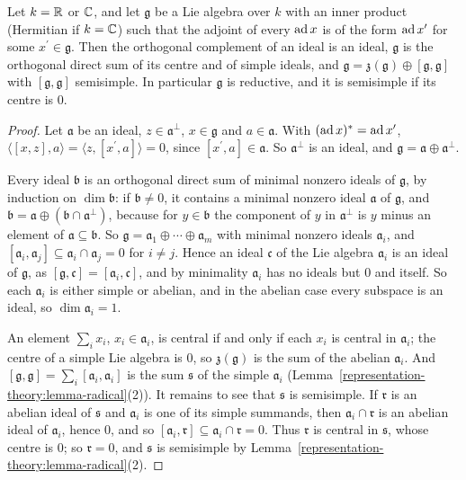 \begin{proposition}\label{representation-theory:proposition-reductive}
Let $k = \mathbb{R}$ or $\mathbb{C}$, and let $\mathfrak{g}$ be a Lie algebra over $k$ with an inner product (Hermitian if $k = \mathbb{C}$) such that the adjoint of every $\operatorname{ad} x$ is of the form
$\operatorname{ad} x^{\prime}$ for some $x^{\prime} \in \mathfrak{g}$. Then the orthogonal complement of an ideal is an ideal, $\mathfrak{g}$ is the orthogonal direct sum of its centre
and of simple ideals, and $\mathfrak{g} = \mathfrak{z}(\mathfrak{g}) \oplus [\mathfrak{g}, \mathfrak{g}]$ with $[\mathfrak{g}, \mathfrak{g}]$ semisimple. In particular
$\mathfrak{g}$ is reductive, and it is semisimple if its centre is $0$.
\end{proposition}

\begin{proof}
Let $\mathfrak{a}$ be an ideal, $z \in \mathfrak{a}^\perp$, $x \in \mathfrak{g}$ and $a \in \mathfrak{a}$. With $(\operatorname{ad} x)^* = \operatorname{ad} x^{\prime}$,
$\langle[x, z], a\rangle = \langle z, [x^{\prime}, a]\rangle = 0$, since $[x^{\prime}, a] \in \mathfrak{a}$. So $\mathfrak{a}^\perp$ is an ideal, and $\mathfrak{g} = \mathfrak{a}
\oplus \mathfrak{a}^\perp$.

Every ideal $\mathfrak{b}$ is an orthogonal direct sum of minimal nonzero ideals of $\mathfrak{g}$, by induction on $\dim\mathfrak{b}$: if $\mathfrak{b} \neq 0$, it contains a minimal
nonzero ideal $\mathfrak{a}$ of $\mathfrak{g}$, and $\mathfrak{b} = \mathfrak{a} \oplus (\mathfrak{b} \cap \mathfrak{a}^\perp)$, because for $y \in \mathfrak{b}$ the component of
$y$ in $\mathfrak{a}^\perp$ is $y$ minus an element of $\mathfrak{a} \subseteq \mathfrak{b}$. So $\mathfrak{g} = \mathfrak{a}_1 \oplus \cdots \oplus \mathfrak{a}_m$ with minimal
nonzero ideals $\mathfrak{a}_i$, and $[\mathfrak{a}_i, \mathfrak{a}_j] \subseteq \mathfrak{a}_i \cap \mathfrak{a}_j = 0$ for $i \neq j$. Hence an ideal $\mathfrak{c}$ of the Lie
algebra $\mathfrak{a}_i$ is an ideal of $\mathfrak{g}$, as $[\mathfrak{g}, \mathfrak{c}] = [\mathfrak{a}_i, \mathfrak{c}]$, and by minimality $\mathfrak{a}_i$ has no ideals but
$0$ and itself. So each $\mathfrak{a}_i$ is either simple or abelian, and in the abelian case every subspace is an ideal, so $\dim\mathfrak{a}_i = 1$.

An element $\sum_ix_i$, $x_i \in \mathfrak{a}_i$, is central if and only if each $x_i$ is central in $\mathfrak{a}_i$; the centre of a simple Lie algebra is $0$, so
$\mathfrak{z}(\mathfrak{g})$ is the sum of the abelian $\mathfrak{a}_i$. And $[\mathfrak{g}, \mathfrak{g}] = \sum_i[\mathfrak{a}_i, \mathfrak{a}_i]$ is the sum $\mathfrak{s}$ of the
simple $\mathfrak{a}_i$ (Lemma~\ref{representation-theory:lemma-radical}(2)). It remains to see that $\mathfrak{s}$ is semisimple. If $\mathfrak{r}$ is an abelian ideal of
$\mathfrak{s}$ and $\mathfrak{a}_i$ is one of its simple summands, then $\mathfrak{a}_i \cap \mathfrak{r}$ is an abelian ideal of $\mathfrak{a}_i$, hence $0$, and so
$[\mathfrak{a}_i, \mathfrak{r}] \subseteq \mathfrak{a}_i \cap \mathfrak{r} = 0$. Thus $\mathfrak{r}$ is central in $\mathfrak{s}$, whose centre is $0$; so $\mathfrak{r} = 0$, and
$\mathfrak{s}$ is semisimple by Lemma~\ref{representation-theory:lemma-radical}(2).
\end{proof}

